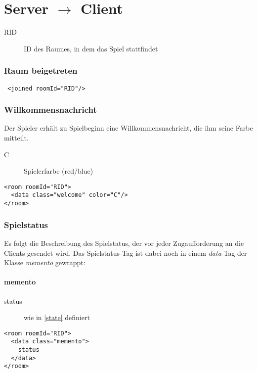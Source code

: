 \documentclass[12pt,a4paper, ngerman, oneside]{scrartcl}
\begin{document}
\newpage
\part{Server $\rightarrow$ Client}
\begin{description}
\item[RID] ID des Raumes, in dem das Spiel stattfindet
\end{description}

\section{Raum beigetreten}
 \begin{verbatim}
 <joined roomId="RID"/>
 \end{verbatim}

\section{Willkommensnachricht}
Der Spieler erhält zu Spielbeginn eine Willkommensnachricht, die ihm seine Farbe mitteilt.
\begin{description}
\item[C] Spielerfarbe (red/blue)
\end{description}
\begin{verbatim}
<room roomId="RID">
  <data class="welcome" color="C"/>
</room>
\end{verbatim}

\section{Spielstatus}
Es folgt die Beschreibung des Spielstatus, der vor jeder Zugaufforderung an die Clients gesendet wird. Das Spielstatus-Tag ist dabei noch in einem \textit{data}-Tag der Klasse \textit{memento} gewrappt:
\subsection{memento}
\begin{description}
\item[status] wie in \ref{state} definiert
\end{description}
\begin{verbatim}
<room roomId="RID"> 
  <data class="memento"> 
  	status
  </data> 
</room>
\end{verbatim}
\end{document}
